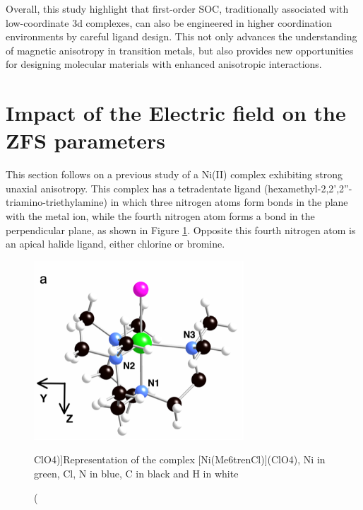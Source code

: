 \documentclass[12pt]{report}
\numberwithin{equation}{section}
\begin{document}
Overall, this study highlight that first-order SOC, traditionally associated with low-coordinate 3d complexes, can also be engineered in higher coordination environments by careful ligand design.
This not only advances the understanding of magnetic anisotropy in transition metals, but also provides new opportunities for designing molecular materials with enhanced anisotropic interactions.


\newpage


\newpage

\section{Impact of the Electric field on the ZFS parameters}

This section follows on a previous study of a Ni(II) complex exhibiting strong unaxial anisotropy.
This complex has a tetradentate ligand (hexamethyl-2,2',2''-triamino-triethylamine) in which three nitrogen atoms form bonds in the plane with the metal ion, while the fourth nitrogen atom forms a bond in the perpendicular plane, as shown in Figure \ref{NiMe6tren}.
Opposite this fourth nitrogen atom is an apical halide ligand, either chlorine or bromine.

\begin{figure}[!ht]
    \centering
    \includegraphics[width=0.7\textwidth]{Images/NiMe6trenTalal.png}
    \caption[Representation of the complex [Ni(Me6trenCl)](ClO4)]{Representation of the complex [Ni(Me6trenCl)](ClO4), Ni in green, Cl, N in blue, C in black and H in white}
    \label{NiMe6tren}
\end{figure}
\end{document}
